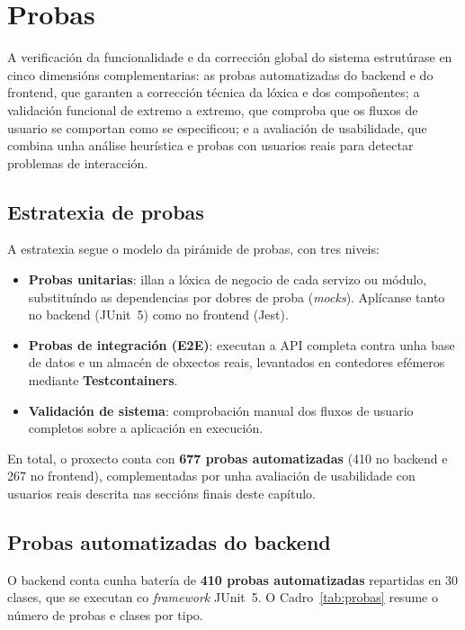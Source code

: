 \chapter{Probas}
\label{ch:probas}

A verificación da funcionalidade e da corrección global do sistema estrutúrase en cinco
dimensións complementarias: as probas automatizadas do backend e do frontend,
que garanten a corrección técnica da lóxica e dos compoñentes; a validación
funcional de extremo a extremo, que comproba que os fluxos de usuario se comportan como
se especificou; e a avaliación de usabilidade, que combina unha análise
heurística e probas con usuarios reais para detectar problemas de interacción.

\section{Estratexia de probas}

A estratexia segue o modelo da pirámide de probas, con tres niveis:

\begin{itemize}
  \item \textbf{Probas unitarias}: illan a lóxica de negocio de cada servizo ou módulo,
        substituíndo as dependencias por dobres de proba (\textit{mocks}). Aplícanse tanto
        no backend (JUnit~5) como no frontend (Jest).
  \item \textbf{Probas de integración (E2E)}: executan a API completa contra unha base de
        datos e un almacén de obxectos reais, levantados en contedores efémeros mediante
        \textbf{Testcontainers}.
  \item \textbf{Validación de sistema}: comprobación manual dos fluxos de usuario completos
        sobre a aplicación en execución.
\end{itemize}

En total, o proxecto conta con \textbf{677 probas automatizadas} (410 no backend e 267
no frontend), complementadas por unha avaliación de usabilidade con usuarios reais
descrita nas seccións finais deste capítulo.

\section{Probas automatizadas do backend}

O backend conta cunha batería de \textbf{410 probas automatizadas} repartidas en 30 clases,
que se executan co \textit{framework} JUnit~5. O Cadro~\ref{tab:probas} resume o número de
probas e clases por tipo.

